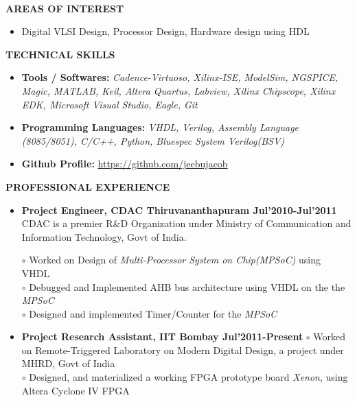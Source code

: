 \documentclass[a4paper,10pt]{article}
\begin{document}
\paragraph{}
\textbf{ }
\vspace{1.7in}


\colorbox{titleColor}{\parbox{6.5in}{\textbf{AREAS OF INTEREST}}}
 \begin{itemize}
  \setlength{\itemsep}{1pt}
  \item {{  Digital VLSI Design, Processor Design, Hardware design using HDL}}
 \end{itemize}

 \colorbox{titleColor}{\parbox{6.5in}{\textbf{TECHNICAL SKILLS}}}

 \begin{itemize}
  \setlength{\itemsep}{1pt}
  \item \textbf{{Tools / Softwares:}} \textit{Cadence-Virtuoso, Xilinx-ISE, ModelSim, NGSPICE, Magic, MATLAB, Keil, Altera Quartus, Labview, Xilinx Chipscope, Xilinx EDK, Microsoft Visual Studio, Eagle, Git}
  \item \textbf{{Programming Languages:}} \textit{VHDL, Verilog, Assembly Language (8085/8051), C/C++, Python, Bluespec System Verilog(BSV)}
  \item \textbf{{Github Profile:}} \url{https://github.com/jeebujacob}
 \end{itemize}
 
 
 
  \colorbox{titleColor}{\parbox{6.5in}{\textbf{PROFESSIONAL EXPERIENCE}}}
   \begin{itemize}
    \item \textbf{Project Engineer, CDAC Thiruvananthapuram \qquad\qquad\qquad\quad\qquad\qquad Jul'2010-Jul'2011\\}
    CDAC is a premier R\&D Organization under Ministry of Communication and Information Technology, Govt of India.

    $\circ$  Worked on  Design of \textit{Multi-Processor System on Chip(MPSoC)} using VHDL \\
    $\circ$  Debugged and Implemented AHB bus architecture using VHDL on the the \textit{MPSoC}\\
    $\circ$  Designed and implemented Timer/Counter for the \textit{MPSoC}
    \item \textbf{Project Research Assistant, IIT Bombay 	\qquad\qquad\qquad\qquad\quad\qquad\qquad\qquad Jul'2011-Present}
     $\circ$ Worked on Remote-Triggered Laboratory on Modern Digital Design, a project under MHRD, Govt of India\\
    $\circ$ Designed, and materialized a working FPGA prototype board \textit{Xenon}, using Altera Cyclone IV FPGA  
    
 \end{itemize}
 
\end{document}
